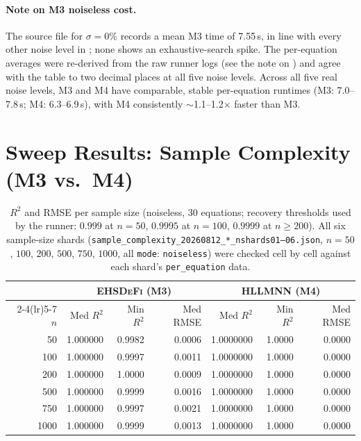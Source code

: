 \documentclass[twoside,11pt]{article}
\newcommand{\EHD}{\textsc{EHSDeFi}}
\newcommand{\HSL}{\textsc{HLLMNN}}
\newcommand{\Rsq}{R^{2}}
\begin{document}
\paragraph{Note on M3 noiseless cost.} The source file for $\sigma=0\%$ records a mean M3 time of 7.55\,s, in line with every other noise level in ; none shows an exhaustive-search spike. The per-equation averages were re-derived from the raw runner logs (see the note on ) and agree with the table to two decimal places at all five noise levels. Across all
five real noise levels, M3 and M4 have comparable, stable per-equation
runtimes (M3: 7.0--7.8\,s; M4: 6.3--6.9\,s), with M4 consistently
$\sim$1.1--1.2$\times$ faster than M3.

\section{Sweep Results: Sample Complexity (M3 vs.\ M4)}
\label{sec:sc}

\begin{table}[H]
\centering
\caption{$\Rsq$ and RMSE per sample size (noiseless, 30 equations;
recovery thresholds used by the runner: $0.999$ at $n=50$, $0.9995$ at
$n=100$, $0.9999$ at $n\geq200$).
All six sample-size shards (\texttt{sample\_complexity\_20260812\_*\_nshards01--06.json}, $n=50$, $100$, $200$, $500$, $750$, $1000$, all \texttt{mode}: \texttt{noiseless}) were checked cell by cell against each shard's \texttt{per\_equation} data.}
\label{tab:sc_metrics}
\renewcommand{\arraystretch}{1.2}
\small
\begin{tabular}{r r r r r r r}
\toprule
& \multicolumn{3}{c}{\textcolor{m3blue}{\textbf{\EHD{} (M3)}}}
& \multicolumn{3}{c}{\textcolor{m4red}{\textbf{\HSL{} (M4)}}}\\
\cmidrule(lr){2-4}\cmidrule(lr){5-7}
$n$ & Med $\Rsq$ & Min $\Rsq$ & Med RMSE & Med $\Rsq$ & Min $\Rsq$ & Med RMSE\\
\midrule
  50 & 1.000000 & 0.9982 & 0.0006 & 1.0000000 & 1.0000 & 0.0000\\
 100 & 1.000000 & 0.9997 & 0.0011 & 1.0000000 & 1.0000 & 0.0000\\
 200 & 1.000000 & 1.0000 & 0.0009 & 1.0000000 & 1.0000 & 0.0000\\
 500 & 1.000000 & 0.9999 & 0.0016 & 1.0000000 & 1.0000 & 0.0000\\
 750 & 1.000000 & 0.9997 & 0.0021 & 1.0000000 & 1.0000 & 0.0000\\
1000 & 1.000000 & 0.9999 & 0.0013 & 1.0000000 & 1.0000 & 0.0000\\
\bottomrule
\end{tabular}
\end{table}
\end{document}
